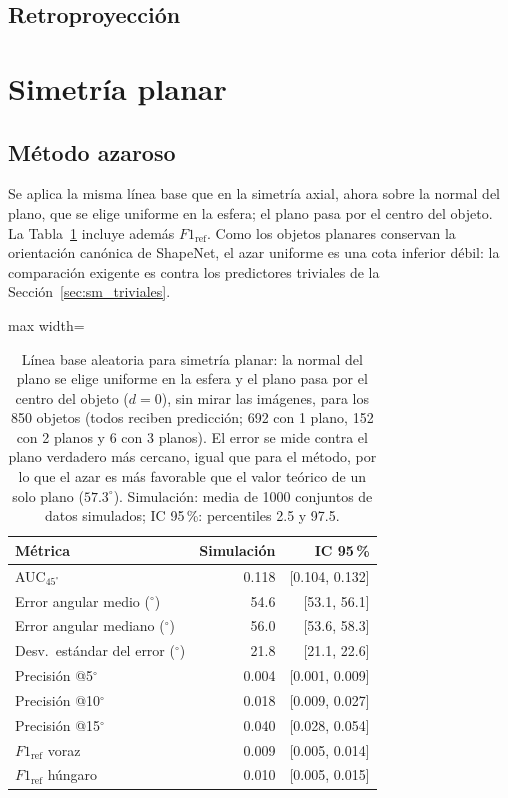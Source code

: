 \subsection{Retroproyección}






\newpage
\section{Simetría planar}
\label{sec:sm_res_plano}

\subsection{Método azaroso}

Se aplica la misma línea base que en la simetría axial, ahora sobre la normal del
plano, que se elige uniforme en la esfera; el plano pasa por el centro del objeto.
La Tabla~\ref{tab:plane_azar} incluye además $F1_{\mathrm{ref}}$. Como los objetos
planares conservan la orientación canónica de ShapeNet, el azar uniforme es una cota
inferior débil: la comparación exigente es contra los predictores triviales de la
Sección~\ref{sec:sm_triviales}.


\begin{table}[htbp]
\centering
\caption{Línea base aleatoria para simetría planar: la normal del plano se elige uniforme en la esfera y el plano pasa por el centro del objeto ($d=0$), sin mirar las imágenes, para los 850 objetos (todos reciben predicción; 692 con 1 plano, 152 con 2 planos y 6 con 3 planos). El error se mide contra el plano verdadero más cercano, igual que para el método, por lo que el azar es más favorable que el valor teórico de un solo plano ($57.3^\circ$). Simulación: media de 1000 conjuntos de datos simulados; IC 95\,\%: percentiles 2.5 y 97.5.}
\label{tab:plane_azar}
\begin{adjustbox}{max width=\textwidth}
\begin{tabular}{lrr}
\toprule
Métrica & Simulación & IC 95\,\% \\
\midrule
AUC$_{45^\circ}$ & 0.118 & [0.104, 0.132] \\
Error angular medio ($^\circ$) & 54.6 & [53.1, 56.1] \\
Error angular mediano ($^\circ$) & 56.0 & [53.6, 58.3] \\
Desv.\ estándar del error ($^\circ$) & 21.8 & [21.1, 22.6] \\
Precisión @5$^\circ$ & 0.004 & [0.001, 0.009] \\
Precisión @10$^\circ$ & 0.018 & [0.009, 0.027] \\
Precisión @15$^\circ$ & 0.040 & [0.028, 0.054] \\
$F1_{\mathrm{ref}}$ voraz & 0.009 & [0.005, 0.014] \\
$F1_{\mathrm{ref}}$ húngaro & 0.010 & [0.005, 0.015] \\
\bottomrule
\end{tabular}
\end{adjustbox}
\end{table}


